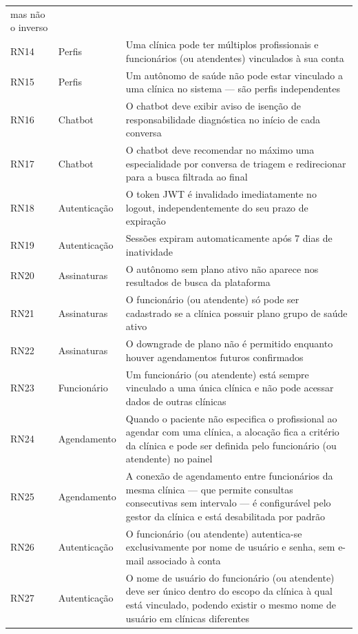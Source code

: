 \begin{center}
\begin{longtable}{p{1.2cm}p{3cm}p{7.5cm}}
        mas não o inverso \\
  RN14 & Perfis
      & Uma clínica pode ter múltiplos
        profissionais e funcionários
        (ou atendentes) vinculados
        à sua conta \\
  RN15 & Perfis
      & Um autônomo de saúde não pode estar
        vinculado a uma clínica no sistema
        --- são perfis independentes \\
  RN16 & Chatbot
      & O chatbot deve exibir aviso de
        isenção de responsabilidade
        diagnóstica no início de cada
        conversa \cite{cfm23362023,masanneck2024} \\
  RN17 & Chatbot
      & O chatbot deve recomendar no máximo
        uma especialidade por conversa de
        triagem e redirecionar para a busca
        filtrada ao final \cite{masanneck2024} \\
  RN18 & Autenticação
      & O token JWT é invalidado
        imediatamente no logout,
        independentemente do seu prazo
        de expiração \cite{rfc7519} \\
  RN19 & Autenticação
      & Sessões expiram automaticamente
        após 7 dias de inatividade \\
  RN20 & Assinaturas
      & O autônomo sem plano ativo não
        aparece nos resultados de busca
        da plataforma \\
  RN21 & Assinaturas
      & O funcionário (ou atendente) só
        pode ser cadastrado se a clínica
        possuir plano grupo de saúde ativo \\
  RN22 & Assinaturas
      & O downgrade de plano não é
        permitido enquanto houver
        agendamentos futuros confirmados \\
  RN23 & Funcionário
      & Um funcionário (ou atendente) está
        sempre vinculado a uma única clínica
        e não pode acessar dados de outras
        clínicas \\
  RN24 & Agendamento
      & Quando o paciente não especifica o
        profissional ao agendar com uma
        clínica, a alocação fica a critério
        da clínica e pode ser definida pelo
        funcionário (ou atendente) no painel \\
  RN25 & Agendamento
      & A conexão de agendamento entre
        funcionários da mesma clínica ---
        que permite consultas consecutivas
        sem intervalo --- é configurável
        pelo gestor da clínica e está
        desabilitada por padrão \\
  RN26 & Autenticação
      & O funcionário (ou atendente) autentica-se
        exclusivamente por nome de usuário e senha,
        sem e-mail associado à conta \\
  RN27 & Autenticação
      & O nome de usuário do funcionário (ou
        atendente) deve ser único dentro do
        escopo da clínica à qual está vinculado,
        podendo existir o mesmo nome de usuário
        em clínicas diferentes \\
  \end{longtable}
\end{center}

